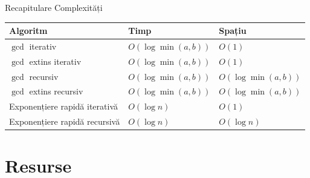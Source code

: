 ﻿\documentclass{beamer}
\begin{document}
\begin{frame}{Recapitulare \textemdash{} Complexități}
  \begin{center}
  \begin{tabular}{lll}
    \toprule
    Algoritm & Timp & Spațiu \\
    \midrule
    $\gcd$ iterativ                & $O(\log \min(a,b))$ & $O(1)$ \\
    $\gcd$ extins iterativ         & $O(\log \min(a,b))$ & $O(1)$ \\
    $\gcd$ recursiv                & $O(\log \min(a,b))$ & $O(\log \min(a,b))$ \\
    $\gcd$ extins recursiv         & $O(\log \min(a,b))$ & $O(\log \min(a,b))$ \\
    Exponențiere rapidă iterativă  & $O(\log n)$         & $O(1)$ \\
    Exponențiere rapidă recursivă  & $O(\log n)$         & $O(\log n)$ \\
    \bottomrule
  \end{tabular}
  \end{center}
\end{frame}

\section{Resurse}
\end{document}
